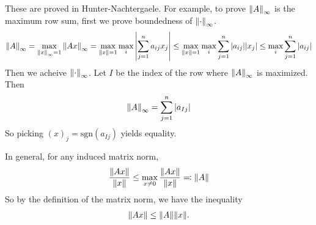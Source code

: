 \documentclass{article}
\newcommand{\sgn}{\text{sgn}}
\begin{document}
                These are proved in Hunter-Nachtergaele.  For example, to prove $\norm{A}_\infty$ is the maximum row sum, first we prove boundedness of $\norm{\cdot}_\infty$.
                \begin{align}
                    \norm{A}_\infty = \max_{\norm{x}_\infty = 1} \norm{Ax}_\infty = \max_{\norm{x} = 1}\max_i\abs{\sum_{j=1}^n a_{ij}x_j} \leq \max_{\norm{x}=1}\max_i\sum_{j=1}^n\abs{a_{ij}}\abs{x_j} \leq \max_i\sum_{j=1}^n\abs{a_{ij}}
                \end{align}
                Then we acheive $\norm{\cdot}_\infty$. Let $I$ be the index of the row where $\norm{A}_\infty$ is maximized.  Then
                \begin{align}
                    \norm{A}_\infty = \sum_{j=1}^n\abs{a_{Ij}}
                \end{align}
                So picking $(x)_j = \sgn(a_{Ij})$ yields equality.

                In general, for any induced matrix norm,
                \begin{align}
                    \frac{\norm{Ax}}{\norm{x}} \leq \max_{x \neq 0}\frac{\norm{Ax}}{\norm{x}} \eqqcolon \norm{A}
                \end{align}
                So by the definition of the matrix norm, we have the inequality
                \begin{align}
                    \norm{Ax} \leq \norm{A}\norm{x}.
                \end{align}
\end{document}
